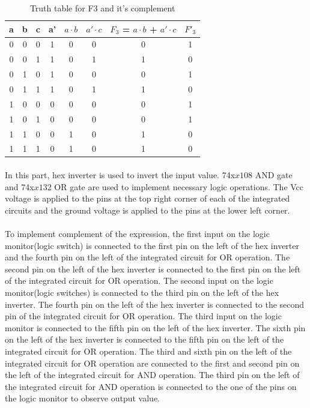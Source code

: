\documentclass[pdftex,12pt,a4paper]{article}
\begin{document}
\begin{flushleft}
\begin{table}[h]
\centering
\begin{tabular}{|c|c|c|c|c|c|c|c|}
\hline
a & b & c & a' & $a \cdot b$ & $a' \cdot c$ & $F_{3}$ = $a \cdot b$ + $a' \cdot c$ & $F'_{3}$ \\ \hline
0 & 0 & 0 & 1  & 0     & 0      & 0                        & 1        \\ 
0 & 0 & 1 & 1  & 0     & 1      & 1                        & 0        \\ 
0 & 1 & 0 & 1  & 0     & 0      & 0                        & 1        \\ 
0 & 1 & 1 & 1  & 0     & 1      & 1                        & 0        \\ 
1 & 0 & 0 & 0  & 0     & 0      & 0                        & 1        \\ 
1 & 0 & 1 & 0  & 0     & 0      & 0                        & 1        \\
1 & 1 & 0 & 0  & 1     & 0      & 1                        & 0        \\ 
1 & 1 & 1 & 0  & 1     & 0      & 1                        & 0        \\ \hline
\end{tabular}
\caption{Truth table for F3 and it's complement}
\label{fig3}
\end{table}

\paragraph{}
In this part, hex inverter is used to invert the input value. 74x$x{1}$08 AND gate and 74x$x{1}$32 OR gate are used to implement necessary logic operations. The Vcc voltage is applied to the pins at the top right corner of each of the integrated circuits and the ground voltage is applied to the pins at the lower left corner. 

\paragraph{}
To implement complement of the expression, the first input on the logic monitor(logic switch) is connected to the first pin on the left of the hex inverter and the fourth pin on the left of the integrated circuit for OR operation. The second pin on the left of the hex inverter is connected to the first pin on the left of the integrated circuit for OR operation. The second input on the logic monitor(logic switches) is connected to the third pin on the left of the hex inverter. The fourth pin on the left of the hex inverter is connected to the second pin of the integrated circuit for OR operation. The third input on the logic monitor is connected to the fifth pin on the left of the hex inverter. The sixth pin on the left of the hex inverter is connected to the fifth pin on the left of the integrated circuit for OR operation. The third and sixth pin on the left of the integrated circuit for OR operation are connected to the first and second pin on the left of the integrated circuit for AND operation. The third pin on the left of the integrated circuit for AND operation is connected to the one of the pins on the logic monitor to observe output value.


\end{flushleft}
\end{document}
